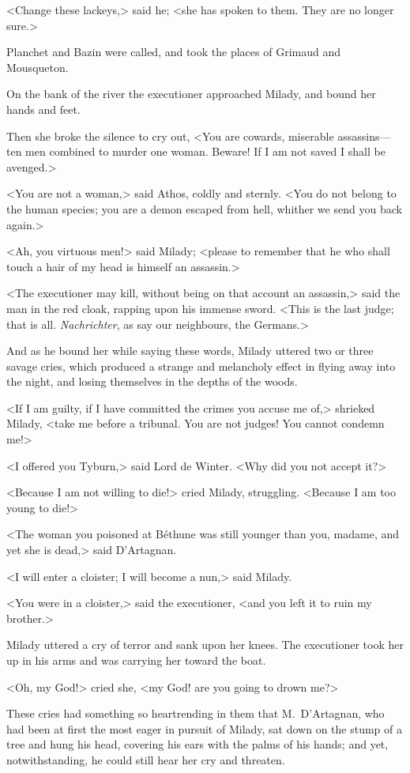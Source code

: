 <Change these lackeys,> said he; <she has spoken to them. They are no longer sure.> 

Planchet and Bazin were called, and took the places of Grimaud and Mousqueton. 

On the bank of the river the executioner approached Milady, and bound her hands and feet. 

Then she broke the silence to cry out, <You are cowards, miserable assassins—ten men combined to murder one woman. Beware! If I am not saved I shall be avenged.> 

<You are not a woman,> said Athos, coldly and sternly. <You do not belong to the human species; you are a demon escaped from hell, whither we send you back again.> 

<Ah, you virtuous men!> said Milady; <please to remember that he who shall touch a hair of my head is himself an assassin.> 

<The executioner may kill, without being on that account an assassin,> said the man in the red cloak, rapping upon his immense sword. <This is the last judge; that is all. \textit{Nachrichter}, as say our neighbours, the Germans.> 

And as he bound her while saying these words, Milady uttered two or three savage cries, which produced a strange and melancholy effect in flying away into the night, and losing themselves in the depths of the woods. 

<If I am guilty, if I have committed the crimes you accuse me of,> shrieked Milady, <take me before a tribunal. You are not judges! You cannot condemn me!> 

<I offered you Tyburn,> said Lord de Winter. <Why did you not accept it?> 

<Because I am not willing to die!> cried Milady, struggling. <Because I am too young to die!> 

<The woman you poisoned at Béthune was still younger than you, madame, and yet she is dead,> said D'Artagnan. 

<I will enter a cloister; I will become a nun,> said Milady. 

<You were in a cloister,> said the executioner, <and you left it to ruin my brother.> 

Milady uttered a cry of terror and sank upon her knees. The executioner took her up in his arms and was carrying her toward the boat. 

<Oh, my God!> cried she, <my God! are you going to drown me?> 

These cries had something so heartrending in them that M.~D'Artagnan, who had been at first the most eager in pursuit of Milady, sat down on the stump of a tree and hung his head, covering his ears with the palms of his hands; and yet, notwithstanding, he could still hear her cry and threaten. 

